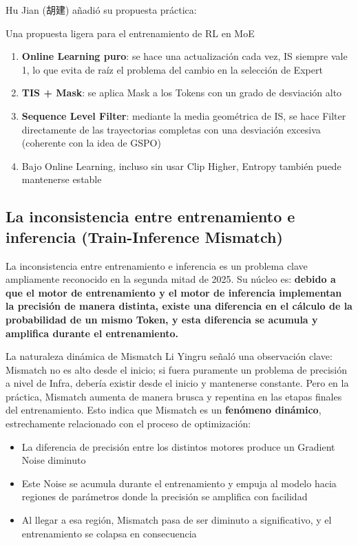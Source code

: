 \documentclass[a4paper]{article}
\begin{document}
Hu Jian (胡建) añadió su propuesta práctica:

\begin{importantbox}{Una propuesta ligera para el entrenamiento de RL en MoE}
\begin{enumerate}
    \item \textbf{Online Learning puro}: se hace una actualización cada vez, IS siempre vale 1, lo que evita de raíz el problema del cambio en la selección de Expert
    \item \textbf{TIS + Mask}: se aplica Mask a los Tokens con un grado de desviación alto
    \item \textbf{Sequence Level Filter}: mediante la media geométrica de IS, se hace Filter directamente de las trayectorias completas con una desviación excesiva (coherente con la idea de GSPO)
    \item Bajo Online Learning, incluso sin usar Clip Higher, Entropy también puede mantenerse estable
\end{enumerate}
\end{importantbox}

\subsection{La inconsistencia entre entrenamiento e inferencia (Train-Inference Mismatch)}

La inconsistencia entre entrenamiento e inferencia es un problema clave ampliamente reconocido en la segunda mitad de 2025. Su núcleo es: \textbf{debido a que el motor de entrenamiento y el motor de inferencia implementan la precisión de manera distinta, existe una diferencia en el cálculo de la probabilidad de un mismo Token, y esta diferencia se acumula y amplifica durante el entrenamiento.}

\begin{warningbox}{La naturaleza dinámica de Mismatch}
Li Yingru señaló una observación clave: Mismatch no es alto desde el inicio; si fuera puramente un problema de precisión a nivel de Infra, debería existir desde el inicio y mantenerse constante. Pero en la práctica, Mismatch aumenta de manera brusca y repentina en las etapas finales del entrenamiento. Esto indica que Mismatch es un \textbf{fenómeno dinámico}, estrechamente relacionado con el proceso de optimización:
\begin{itemize}
    \item La diferencia de precisión entre los distintos motores produce un Gradient Noise diminuto
    \item Este Noise se acumula durante el entrenamiento y empuja al modelo hacia regiones de parámetros donde la precisión se amplifica con facilidad
    \item Al llegar a esa región, Mismatch pasa de ser diminuto a significativo, y el entrenamiento se colapsa en consecuencia
\end{itemize}
\end{warningbox}
\end{document}
